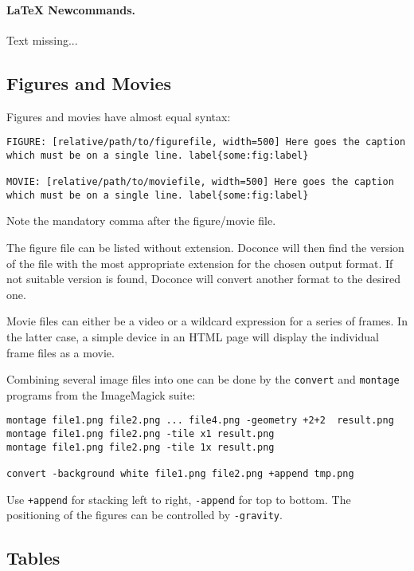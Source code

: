 \documentclass[twoside]{article}
\begin{document}
\noindent
\paragraph{LaTeX Newcommands.}
Text missing...

\subsection{Figures and Movies}

Figures and movies have almost equal syntax:
\begin{Verbatim}
FIGURE: [relative/path/to/figurefile, width=500] Here goes the caption which must be on a single line. label{some:fig:label}

MOVIE: [relative/path/to/moviefile, width=500] Here goes the caption which must be on a single line. label{some:fig:label}

\end{Verbatim}
Note the mandatory comma after the figure/movie file.

The figure file can be listed without extension. Doconce will then find
the version of the file with the most appropriate extension for the chosen
output format. If not suitable version is found, Doconce will convert
another format to the desired one.

Movie files can either be a video or a wildcard expression for a
series of frames. In the latter case, a simple device in an HTML page
will display the individual frame files as a movie.

Combining several image files into one can be done by the
{\fontsize{10pt}{10pt}\verb!convert!} and {\fontsize{10pt}{10pt}\verb!montage!} programs from the ImageMagick suite:
\begin{Verbatim}
montage file1.png file2.png ... file4.png -geometry +2+2  result.png
montage file1.png file2.png -tile x1 result.png
montage file1.png file2.png -tile 1x result.png

convert -background white file1.png file2.png +append tmp.png
\end{Verbatim}
Use {\fontsize{10pt}{10pt}\verb!+append!} for stacking left to right, {\fontsize{10pt}{10pt}\verb!-append!} for top to bottom.
The positioning of the figures can be controlled by {\fontsize{10pt}{10pt}\verb!-gravity!}.

\subsection{Tables}
\end{document}

